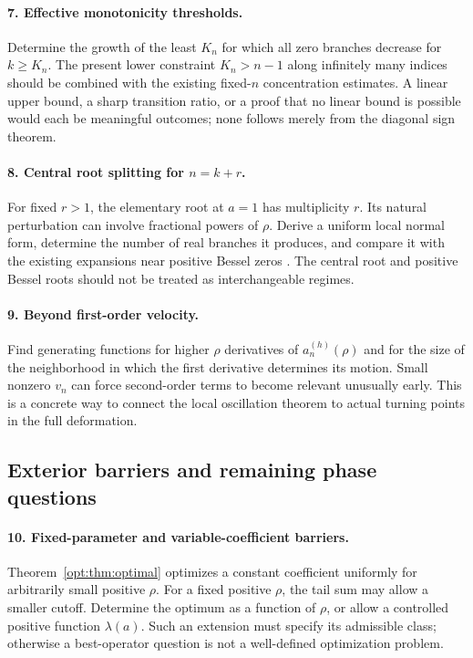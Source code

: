 \paragraph{7. Effective monotonicity thresholds.}
Determine the growth of the least $K_n$ for which all zero branches
decrease for $k\ge K_n$. The present lower constraint
$K_n>n-1$ along infinitely many indices should be combined with the
existing fixed-$n$ concentration estimates. A linear upper bound,
a sharp transition ratio, or a proof that no linear bound is possible
would each be meaningful outcomes; none follows merely from the
diagonal sign theorem.

\paragraph{8. Central root splitting for $n=k+r$.}
For fixed $r>1$, the elementary root at $a=1$ has multiplicity $r$.
Its natural perturbation can involve fractional powers of $\rho$.
Derive a uniform local normal form, determine the number of real
branches it produces, and compare it with the existing expansions
near positive Bessel zeros \cite{IncomingBessel}. The central root
and positive Bessel roots should not be treated as interchangeable
regimes.

\paragraph{9. Beyond first-order velocity.}
Find generating functions for higher $\rho$ derivatives of
$a_n^{(h)}(\rho)$ and for the size of the neighborhood in which
the first derivative determines its motion. Small nonzero
$v_n$ can force second-order terms to become relevant unusually early.
This is a concrete way to connect the local oscillation theorem
to actual turning points in the full deformation.

\subsection{Exterior barriers and remaining phase questions}

\paragraph{10. Fixed-parameter and variable-coefficient barriers.}
Theorem~\ref{opt:thm:optimal} optimizes a constant coefficient uniformly
for arbitrarily small positive $\rho$. For a fixed positive $\rho$, the tail sum may allow
a smaller cutoff. Determine the optimum as a function of $\rho$,
or allow a controlled positive function $\lambda(a)$.
Such an extension must specify its admissible class; otherwise a
best-operator question is not a well-defined optimization problem.

